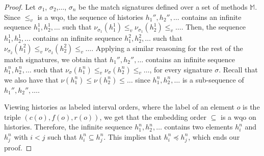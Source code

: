 \begin{proof}
Let $\sigma_1$, $\sigma_2$,$\ldots$, $\sigma_n$ be the match signatures defined over a set of methods $\mathbb{M}$.
Since $\leq_v$ is a wqo, the sequence of histories $h_1'',h_2'',\ldots$ contains an 
infinite sequence $h_{1}^1,h_{2}^1,\ldots$ such that 
$\nu_{\sigma_1}(h_{1}^1)\leq_v \nu_{\sigma_1}(h_{2}^1)\leq_v \ldots$.
Then, the sequence $h_{1}^1,h_{2}^1,\ldots$ contains 
an infinite sequence $h_{1}^2,h_{2}^2,\ldots$ such that 
$\nu_{\sigma_2}(h_{1}^2)\leq_v \nu_{\sigma_2}(h_{2}^2)\leq_v \ldots$.
Applying a similar reasoning for the rest of the match signatures, 
we obtain that $h_1'',h_2'',\ldots$ contains an 
infinite sequence $h_{1}^n,h_{2}^n,\ldots$
such that 
$\nu_{\sigma}(h_{1}^n)\leq_v \nu_{\sigma}(h_{2}^n)\leq_v \ldots$, for every signature $\sigma$.
Recall that we also have that
$\nu(h_1^n)\leq\nu(h_2^n)\leq\ldots$ since $h_{1}^n,h_{2}^n,\ldots$ is a sub-sequence of $h_1'',h_2'',\ldots$.

Viewing histories as labeled interval orders, where the label of an element $o$ is the triple $(c(o),f(o),r(o))$,
we get that the embedding order $\subseteq$ is a wqo on histories. Therefore, the infinite sequence
$h_{1}^n,h_{2}^n,\ldots$  contains two elements $h_{i}^n$ and $h_j^n$ with $i<j$ such that $h_{i}^n\subseteq h_j^n$.
This implies that $h_i^n\preceq h_j^n$, which ends our proof.
\end{proof}
